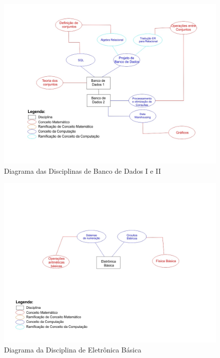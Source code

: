 \documentclass[12pt,a4paper]{article}
\begin{document}
\begin{figure}[!h]
	\centering
	\includegraphics[scale=0.5]{imagens/BD2.jpg} 
	\caption{Diagrama das Disciplinas de Banco de Dados I e II}
\end{figure}

\begin{figure}[!h]
	\centering
	\includegraphics[scale=0.5]{imagens/EB.jpg} 
	\caption{Diagrama da Disciplina de Eletrônica Básica}
\end{figure}
\end{document}
